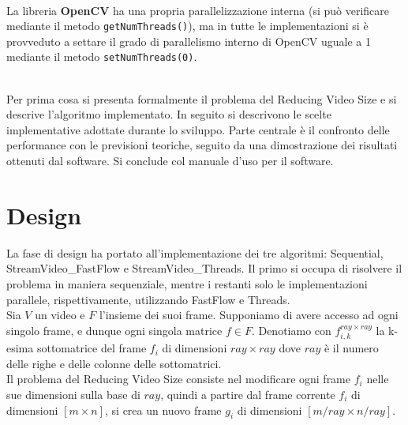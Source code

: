 \documentclass[12pt]{article}
\begin{document}
\\La libreria \textbf{OpenCV} ha una propria parallelizzazione interna (si pu\`o verificare mediante il metodo \texttt{getNumThreads()}), ma in tutte le implementazioni si \`e provveduto a settare il grado di parallelismo interno di OpenCV uguale a 1 mediante il metodo \texttt{setNumThreads(0)}.

\\Per prima cosa si presenta formalmente il problema del Reducing Video Size e si descrive l'algoritmo implementato. In seguito si descrivono le scelte implementative adottate durante lo sviluppo. Parte centrale \`e il confronto delle performance con le previsioni teoriche, seguito da una dimostrazione dei risultati ottenuti dal software. Si conclude col manuale d'uso per il software.



\section{Design}
La fase di design ha portato all'implementazione dei tre algoritmi: Sequential, StreamVideo\_FastFlow e StreamVideo\_Threads. Il primo si occupa di risolvere il problema in maniera sequenziale, mentre i restanti solo le implementazioni parallele, rispettivamente, utilizzando FastFlow e Threads.
\\Sia $V$ un video e $F$ l'insieme dei suoi frame. Supponiamo di avere accesso ad ogni singolo frame, e dunque ogni singola matrice $ f \in F$.
Denotiamo con $f_{i,k}^{ray \times ray}$ la k-esima sottomatrice del frame $f_i$ di dimensioni $ray \times ray$ dove $ray$ \`e il numero delle righe e delle colonne delle sottomatrici. %
\\Il problema del Reducing Video Size consiste nel modificare ogni frame $f_i$ nelle sue dimensioni sulla base di $ray$, quindi a partire dal frame corrente $f_i$ di dimensioni $[m \times n]$, si crea un nuovo frame $g_i$ di dimensioni $[m/ray \times n/ray]$.
\end{document}
